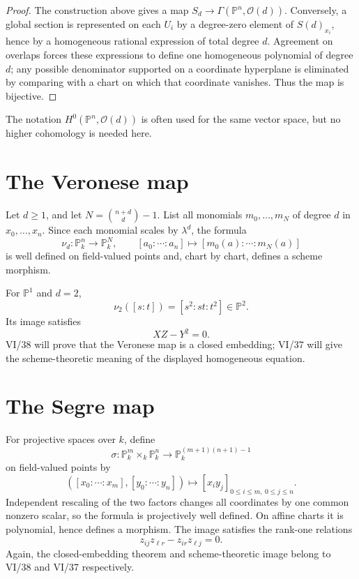 \begin{proof}
The construction above gives a map \(S_d\to\Gamma(\mathbb P^n,\mathcal O(d))\).  Conversely, a global section is represented on each \(U_i\) by a degree-zero element of \(S(d)_{x_i}\), hence by a homogeneous rational expression of total degree \(d\).  Agreement on overlaps forces these expressions to define one homogeneous polynomial of degree \(d\); any possible denominator supported on a coordinate hyperplane is eliminated by comparing with a chart on which that coordinate vanishes.  Thus the map is bijective.
\end{proof}

The notation \(H^0(\mathbb P^n,\mathcal O(d))\) is often used for the same vector space, but no higher cohomology is needed here.

\section{The Veronese map}
Let \(d\ge1\), and let \(N=\binom{n+d}{d}-1\).  List all monomials \(m_0,\ldots,m_N\) of degree \(d\) in \(x_0,\ldots,x_n\).  Since each monomial scales by \(\lambda^d\), the formula
\[
\nu_d:\mathbb P^n_k\longrightarrow\mathbb P^N_k,
\qquad
[a_0:\cdots:a_n]\longmapsto[m_0(a):\cdots:m_N(a)]
\]
is well defined on field-valued points and, chart by chart, defines a scheme morphism.

For \(\mathbb P^1\) and \(d=2\),
\[
\nu_2([s:t])=[s^2:st:t^2]\in\mathbb P^2.
\]
Its image satisfies
\[
XZ-Y^2=0.
\]
VI/38 will prove that the Veronese map is a closed embedding; VI/37 will give the scheme-theoretic meaning of the displayed homogeneous equation.



\section{The Segre map}
For projective spaces over \(k\), define
\[
\sigma:\mathbb P^m_k\times_k\mathbb P^n_k
\longrightarrow\mathbb P^{(m+1)(n+1)-1}_k
\]
on field-valued points by
\[
([x_0:\cdots:x_m],[y_0:\cdots:y_n])
\longmapsto [x_i y_j]_{0\le i\le m,\ 0\le j\le n}.
\]
Independent rescaling of the two factors changes all coordinates by one common nonzero scalar, so the formula is projectively well defined.  On affine charts it is polynomial, hence defines a morphism.  The image satisfies the rank-one relations
\[
z_{ij}z_{\ell r}-z_{ir}z_{\ell j}=0.
\]
Again, the closed-embedding theorem and scheme-theoretic image belong to VI/38 and VI/37 respectively.

